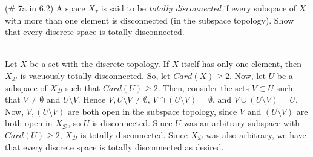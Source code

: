 (\# 7a in 6.2) A space $X_{\tau}$ is said to be \textit{totally disconnected} if every subspace of $X$
with more than one element is disconnected (in the subspace topology). Show that every discrete space is
totally disconnected.\\

\begin{solution}\renewcommand{\qedsymbol}{}\ \\
    Let $X$ be a set with the discrete topology. If $X$ itself has only one element, then
    $X_{\mathcal{D}}$ is vacuously totally disconnected. So, let $Card(X)\geq2$. Now, let $U$ be a
    subspace of $X_{\mathcal{D}}$ such that $Card(U)\geq2$. Then, consider the sets $V\subset U$ such
    that $V\neq\emptyset$ and $U\setminus V$. Hence $V, U\setminus V\neq\emptyset$,
    $V\cap(U\setminus V)=\emptyset$, and $V\cup(U\setminus V)=U$. Now, $V,(U\setminus V)$ are both open
    in the subspace topology, since $V$ and $(U\setminus V)$ are both open in $X_{\mathcal{D}}$, so $U$
    is disconnected. Since $U$ was an arbitrary subspace with $Card(U)\geq2$, $X_{\mathcal{D}}$ is
    totally disconnected. Since $X_{\mathcal{D}}$ was also arbitrary, we have that every discrete space
    is totally disconnected as desired.

\end{solution}
